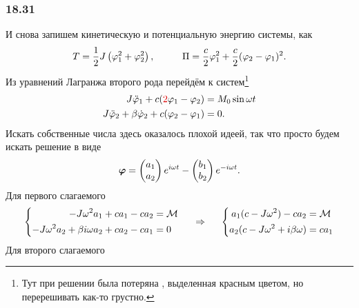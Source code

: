 \subsubsection*{18.31}


И снова запишем кинетическую и потенциальную энергию системы, как
\begin{equation*}
    T = \frac{1}{2} J \left(\varphi_1^2 + \varphi_2^2\right),
    \hspace{1 cm}
    \Pi = \frac{c}{2} \varphi_1^2 + \frac{c}{2}(\varphi_2 - \varphi_1)^2.
\end{equation*}
Из уравнений Лагранжа второго рода перейдём к систем\footnote{
    Тут при решении была потеряна , выделенная красным цветом, но перерешивать как-то грустно.
} 
\begin{align*}
    J \ddot{\varphi}_1 + c(\text{\red{2}}\varphi_1 - \varphi_2) &= M_0 \sin \omega t\\
    J \ddot{\varphi}_2 + \beta \dot{\varphi}_2 + c (\varphi_2 - \varphi_1) &= 0.
\end{align*}
Искать собственные числа здесь оказалось плохой идеей, так что просто будем искать решение в виде
\begin{equation*}
    \mbox{\boldmath $\varphi$} = \begin{pmatrix}
        a_1 \\ a_2
    \end{pmatrix} e^{i\omega t} - 
    \begin{pmatrix}
        b_1 \\ b_2
    \end{pmatrix} e^{-i\omega t}.
\end{equation*}
Для первого слагаемого
\begin{equation*}
    \left\{\begin{aligned}
        - J \omega^2 a_1 + c a_1 - c a_2 &= \mathcal M \\
        - J \omega^2 a_2 + \beta i \omega a_2 + c a_2 - c a_1 &= 0
    \end{aligned}\right.
    \hspace{0.5cm} \Rightarrow \hspace{0.5cm}
    \left\{\begin{aligned}
        a_1 (c - J \omega^2) - c a_2 &= \mathcal M \\
        a_2 (c - J \omega^2 + i \beta \omega) &= c a_1
    \end{aligned}\right.
\end{equation*}
Для второго слагаемого
